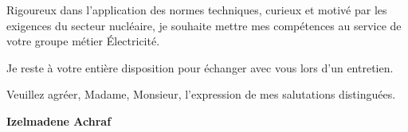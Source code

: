 \documentclass[10pt,a4paper]{altacv}
\begin{document}
\vspace{0.35cm}

Rigoureux dans l'application des normes techniques, curieux et motivé par les exigences du secteur nucléaire, je souhaite mettre mes compétences au service de votre groupe métier Électricité.

\vspace{0.35cm}

Je reste à votre entière disposition pour échanger avec vous lors d'un entretien.

\vspace{0.4cm}

Veuillez agréer, Madame, Monsieur, l'expression de mes salutations distinguées.

\vfill

\begin{flushright}
  \Large\color{emphasis}\textbf{Izelmadene Achraf}
\end{flushright}
\end{document}
